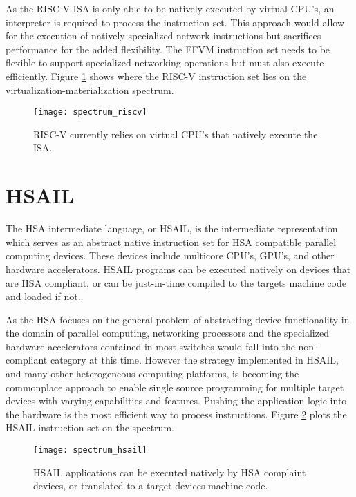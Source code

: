 As the RISC-V ISA is only able to be natively executed by virtual CPU's, an
interpreter is required to process the instruction set. This approach would
allow for the execution of natively specialized network instructions but
sacrifices performance for the added flexibility. The FFVM instruction set
needs to be flexible to support specialized networking operations but must also
execute efficiently. Figure \ref{spectrum_riscv} shows where the RISC-V
instruction set lies on the virtualization-materialization spectrum.

\begin{figure}[h!]
  \centering
  \texttt{[image: spectrum\_riscv]}
  \caption{RISC-V currently relies on virtual CPU's that natively execute the
  ISA.}
  \label{spectrum_riscv}
\end{figure}

\section{HSAIL}
\label{insn:hsail}
The HSA intermediate language, or HSAIL, is the intermediate representation
which serves as an abstract native instruction set for HSA compatible parallel
computing devices. These devices include multicore CPU's, GPU's, and other
hardware accelerators. HSAIL programs can be executed natively on devices that
are HSA compliant, or can be just-in-time compiled to the targets machine code
and loaded if not.

As the HSA focuses on the general problem of abstracting device functionality
in the domain of parallel computing, networking processors and the specialized
hardware accelerators contained in most switches would fall into the
non-compliant category at this time. However the strategy implemented in HSAIL,
and many other heterogeneous computing platforms, is becoming the commonplace
approach to enable single source programming for multiple target devices with
varying capabilities and features. Pushing the application logic into the
hardware is the most efficient way to process instructions. Figure
\ref{spectrum_hsail} plots the HSAIL instruction set on the spectrum.

\begin{figure}[h!]
  \centering
  \texttt{[image: spectrum\_hsail]}
  \caption{HSAIL applications can be executed natively by HSA complaint devices,
  or translated to a target devices machine code.}
  \label{spectrum_hsail}
\end{figure}

